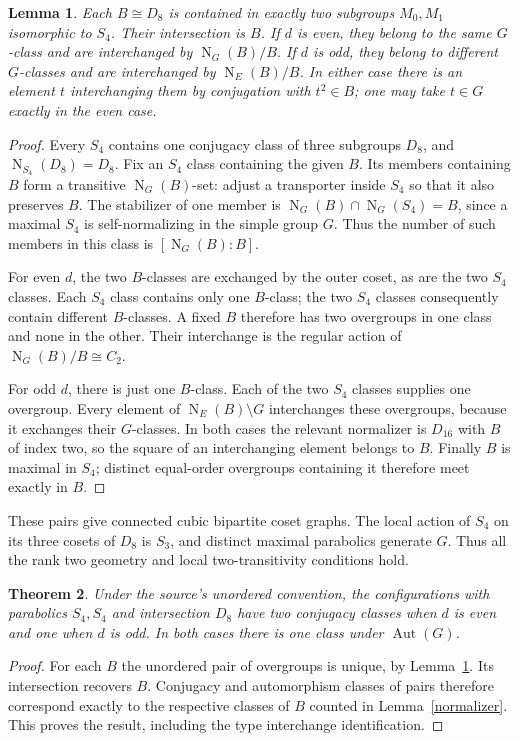\documentclass[11pt]{article}
\newtheorem{lemma}{Lemma}
\newtheorem{theorem}[lemma]{Theorem}
\newcommand{\Aut}{\operatorname{Aut}}
\newcommand{\N}{\operatorname{N}}
\begin{document}
\begin{lemma}\label{overgroups}
Each $B\cong D_8$ is contained in exactly two subgroups $M_0,M_1$
isomorphic to $S_4$. Their intersection is $B$. If $d$ is even,
they belong to the same $G$-class and are interchanged by
$\N_G(B)/B$. If $d$ is odd, they belong to different $G$-classes
and are interchanged by $\N_E(B)/B$.
In either case there is an element $t$ interchanging them by conjugation
with $t^2\in B$; one may take $t\in G$ exactly in the even case.
\end{lemma}
\begin{proof}
Every $S_4$ contains one conjugacy class of three subgroups $D_8$,
and $\N_{S_4}(D_8)=D_8$. Fix an $S_4$ class containing the given
$B$. Its members containing $B$ form a transitive $\N_G(B)$-set:
adjust a transporter inside $S_4$ so that it also preserves $B$.
The stabilizer of one member is
$\N_G(B)\cap\N_G(S_4)=B$, since a maximal $S_4$ is
self-normalizing in the simple group $G$. Thus the number of such
members in this class is $[\N_G(B):B]$.

For even $d$, the two $B$-classes are exchanged by the outer coset,
as are the two $S_4$ classes. Each $S_4$ class contains only one
$B$-class; the two $S_4$ classes consequently contain different
$B$-classes. A fixed $B$ therefore has two overgroups in one class
and none in the other. Their interchange is the regular action of
$\N_G(B)/B\cong C_2$.

For odd $d$, there is just one $B$-class. Each of the two $S_4$
classes supplies one overgroup. Every element of $\N_E(B)\setminus G$
interchanges these overgroups, because it exchanges their $G$-classes.
In both cases the relevant normalizer is $D_{16}$ with $B$ of index
two, so the square of an interchanging element belongs to $B$.
Finally $B$ is maximal in $S_4$; distinct equal-order overgroups
containing it therefore meet exactly in $B$.
\end{proof}

These pairs give connected cubic bipartite coset graphs. The local
action of $S_4$ on its three cosets of $D_8$ is $S_3$, and distinct
maximal parabolics generate $G$. Thus all the rank two geometry and
local two-transitivity conditions hold.

\begin{theorem}\label{counts}
Under the source's unordered convention, the configurations with
parabolics $S_4,S_4$ and intersection $D_8$ have two conjugacy classes
when $d$ is even and one when $d$ is odd. In both cases there is one
class under $\Aut(G)$.
\end{theorem}
\begin{proof}
For each $B$ the unordered pair of overgroups is unique, by
Lemma~\ref{overgroups}. Its intersection recovers $B$. Conjugacy
and automorphism classes of pairs therefore correspond exactly to
the respective classes of $B$ counted in Lemma~\ref{normalizer}.
This proves the result, including the type interchange identification.
\end{proof}
\end{document}
